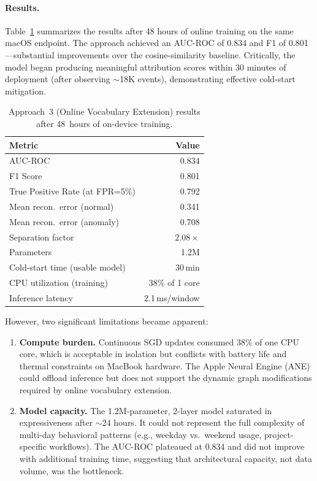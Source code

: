 \documentclass[letterpaper,twocolumn,10pt]{article}
\begin{document}
\paragraph{Results.}
Table~\ref{tab:a3_results} summarizes the results after 48 hours
of online training on the same macOS endpoint.  The approach
achieved an AUC-ROC of 0.834 and F1 of 0.801---substantial
improvements over the cosine-similarity baseline.  Critically, the
model began producing meaningful attribution scores within 30
minutes of deployment (after observing $\sim$18K events),
demonstrating effective cold-start mitigation.

\begin{table}[t]
\centering
\caption{Approach~3 (Online Vocabulary Extension) results after
48~hours of on-device training.}
\label{tab:a3_results}
\small
\begin{tabular}{@{}lr@{}}
\toprule
\textbf{Metric} & \textbf{Value} \\
\midrule
AUC-ROC & 0.834 \\
F1 Score & 0.801 \\
True Positive Rate (at FPR=5\%) & 0.792 \\
Mean recon.\ error (normal) & 0.341 \\
Mean recon.\ error (anomaly) & 0.708 \\
Separation factor & $2.08\times$ \\
Parameters & 1.2M \\
Cold-start time (usable model) & 30\,min \\
CPU utilization (training) & 38\% of 1 core \\
Inference latency & 2.1\,ms/window \\
\bottomrule
\end{tabular}
\end{table}

However, two significant limitations became apparent:

\begin{enumerate}[nosep,leftmargin=*]
\item \textbf{Compute burden.}  Continuous SGD updates consumed
  38\% of one CPU core, which is acceptable in isolation but
  conflicts with battery life and thermal constraints on MacBook
  hardware.  The Apple Neural Engine (ANE) could offload inference
  but does not support the dynamic graph modifications required by
  online vocabulary extension.

\item \textbf{Model capacity.}  The 1.2M-parameter, 2-layer model
  saturated in expressiveness after $\sim$24 hours.  It could not
  represent the full complexity of multi-day behavioral patterns
  (e.g., weekday vs.\ weekend usage, project-specific workflows).
  The AUC-ROC plateaued at 0.834 and did not improve with
  additional training time, suggesting that architectural capacity,
  not data volume, was the bottleneck.
\end{enumerate}
\end{document}
